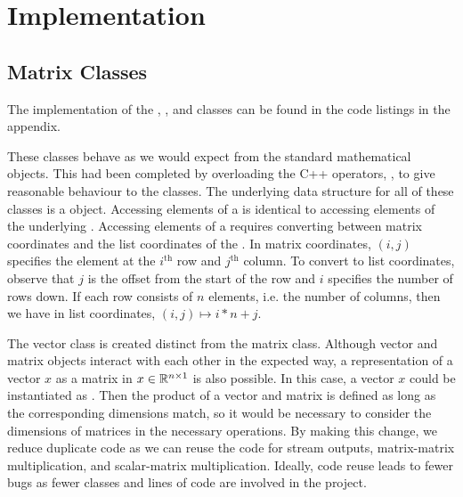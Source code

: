 \fi

\section{Implementation}

\iffalse
Implementation discussion:

+Better band storage for wide bands with lots of zeros. Store the nonzeros with their locations.
-Better interaction with the program for inputting data or getting results. Use of a scripting language and parser. 
+Should treat vectors as matrices, reduces number of classes, fewer bugs and easier implementation.
+Sparse matrices
Unit tests
Error handling
\fi

\subsection{Matrix Classes}

The implementation of the , , and  classes can be found in the code listings in the appendix.

These classes behave as we would expect from the standard mathematical objects. 
This had been completed by overloading the C++ operators, \inline{+, -, *, /}, to give reasonable behaviour to the classes.
The underlying data structure for all of these classes is a  object.
Accessing elements of a  is identical to accessing elements of the underlying .
Accessing elements of a  requires converting between matrix coordinates and the list coordinates of the .
In matrix coordinates, $(i,j)$ specifies the element at the $i^\mathrm{th}$ row and $j^\mathrm{th}$ column.
To convert to list coordinates, observe that $j$ is the offset from the start of the row and $i$ specifies the number of rows down.
If each row consists of $n$ elements, i.e. the number of columns, then we have in list coordinates, $(i,j) \mapsto i*n + j$.


The vector class is created distinct from the matrix class.
Although vector and matrix objects interact with each other in the expected way, a representation of a vector $x$ as a matrix in $x\in\mathbb{R}^{n\times 1}$ is also possible.
In this case, a vector $x$ could be instantiated as .
Then the product of a vector and matrix is defined as long as the corresponding dimensions match, so it would be necessary to consider the dimensions of matrices in the necessary operations.
By making this change, we reduce duplicate code as we can reuse the code for stream outputs, matrix-matrix multiplication, and scalar-matrix multiplication.
Ideally, code reuse leads to fewer bugs as fewer classes and lines of code are involved in the project.



